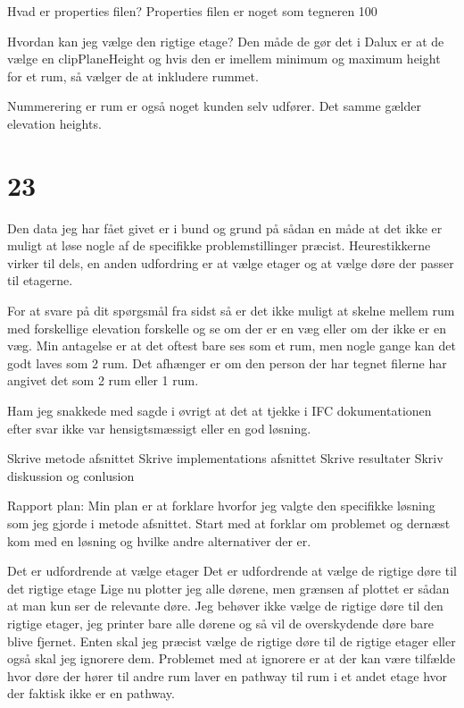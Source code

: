 Hvad er properties filen?
Properties filen er noget som tegneren 100 %

Hvordan kan jeg vælge den rigtige etage?
Den måde de gør det i Dalux er at de vælge en clipPlaneHeight og hvis den er imellem minimum og maximum height for et rum, så vælger de at inkludere rummet.

Nummerering er rum er også noget kunden selv udfører.
Det samme gælder elevation heights.

\section{23}

Den data jeg har fået givet er i bund og grund på sådan en måde at det ikke er muligt at løse nogle af de specifikke problemstillinger præcist.
Heurestikkerne virker til dels, en anden udfordring er at vælge etager og at vælge døre der passer til etagerne.

For at svare på dit spørgsmål fra sidst så er det ikke muligt at skelne mellem rum med forskellige elevation forskelle og se om der er en væg eller om der ikke er en væg. Min antagelse er at det oftest bare ses som et rum, men nogle gange kan det godt laves som 2 rum. Det afhænger er om den person der har tegnet filerne har angivet det som 2 rum eller 1 rum. 

Ham jeg snakkede med sagde i øvrigt at det at tjekke i IFC dokumentationen efter svar ikke var hensigtsmæssigt eller en god løsning.




Skrive metode afsnittet
Skrive implementations afsnittet
Skrive resultater
Skriv diskussion og conlusion


Rapport plan:
Min plan er at forklare hvorfor jeg valgte den specifikke løsning som jeg gjorde i metode afsnittet.
Start med at forklar om problemet og dernæst kom med en løsning og hvilke andre alternativer der er.

Det er udfordrende at vælge etager
Det er udfordrende at vælge de rigtige døre til det rigtige etage
Lige nu plotter jeg alle dørene, men grænsen af plottet er sådan at man kun ser de relevante døre.
Jeg behøver ikke vælge de rigtige døre til den rigtige etager, jeg printer bare alle dørene og så vil de overskydende døre bare 
blive fjernet.
Enten skal jeg præcist vælge de rigtige døre til de rigtige etager eller også skal jeg ignorere dem. Problemet med at ignorere er at der kan være tilfælde hvor døre der hører til andre rum laver en pathway til rum i et andet etage hvor der faktisk ikke er en pathway.

